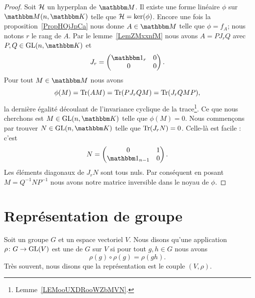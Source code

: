 \begin{proof}
    Soit \( \mathcal{H}\) un hyperplan de \( \eM\). Il existe une forme linéaire \( \phi\) sur \( \eM(n,\eK)\) telle que \( \mathcal{H}=\ker(\phi)\). Encore une fois la proposition~\ref{PropHOjJpCa} nous donne \( A\in \eM\) telle que \( \phi=f_A\); nous notons \( r\) le rang de \( A\). Par le lemme~\ref{LemZMxxnfM} nous avons \( A=PJ_rQ\) avec \( P,Q\in \GL(n,\eK)\) et
    \begin{equation}
        J_r=\begin{pmatrix}
            \mtu_r    &   0    \\
            0    &   0
        \end{pmatrix}.
    \end{equation}
    Pour tout \( M\in \eM\) nous avons
    \begin{equation}
        \phi(M)=\operatorname{Tr}(AM)=\operatorname{Tr}(PJ_rQM)=\operatorname{Tr}(J_rQMP),
    \end{equation}
la dernière égalité découlant de l'invariance cyclique de la trace\footnote{Lemme~\ref{LEMooUXDRooWZbMVN}.}. Ce que nous cherchons est \( M\in \GL(n,\eK)\) telle que \( \phi(M)=0\). Nous commençons par trouver \( N\in\GL(n,\eK)\) telle que \( \operatorname{Tr}(J_rN)=0\). Celle-là est facile : c'est
    \begin{equation}
        N=\begin{pmatrix}
            0    &   1    \\
            \mtu_{n-1}    &   0
        \end{pmatrix}.
    \end{equation}
    Les éléments diagonaux de \( J_rN\) sont tous nuls. Par conséquent en posant \( M=Q^{-1}NP^{-1}\) nous avons notre matrice inversible dans le noyau de \( \phi\).
\end{proof}

\section{Représentation de groupe}

\begin{definition}[Représentation]      \label{DEFooXVMSooXDIfZV}
    Soit un groupe \( G\) et un espace vectoriel \( V\). Nous disons qu'une application \( \rho\colon G\to \textup{GL}(V)\) est une  de \( G\) sur \( V\) si pour tout \( g,h\in G\) nous avons
    \begin{equation}
        \rho(g)\circ\rho(g)=\rho(gh).
    \end{equation}
    Très souvent, nous disons que la représentation est le couple \( (V,\rho)\).
\end{definition}

